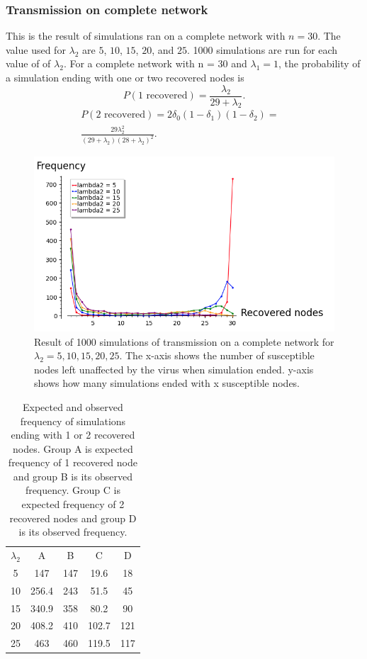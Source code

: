 \documentclass[12pt]{article} %
\numberwithin{equation}{section}
\begin{document}
\subsubsection{Transmission on complete network}\label{simsircomsec}
This is the result of simulations ran on a complete network with $n=30$. The value used for $\lambda_2$ are $5$, $10$, $15$, $20$, and $25$. 1000 simulations are run for each value of of $\lambda_2$. For a complete network with n = 30 and $\lambda_1 = 1$, the probability of a simulation ending with one or two recovered nodes is
\begin{equation}\label{bara1complete}
    P(\text{1 recovered}) = \frac{\lambda_2}{29+\lambda_2}.
\end{equation}
\begin{align}\label{bara2complete}
    P(\text{2 recovered}) = 2\delta_0(1-\delta_1)(1-\delta_2) = & \\ \frac{29\lambda_2^2}{(29+\lambda_2)(28+\lambda_2)^2}.
\end{align}
\begin{figure}[H]
    \centering
    \includegraphics[scale=0.7]{completeSIR.png}   
    \caption{Result of 1000 simulations of transmission on a complete network for $\lambda_2 = 5,10,15,20,25$. The x-axis shows the number of susceptible nodes left unaffected by the virus when simulation ended. y-axis shows how many simulations ended with x susceptible nodes.}
    \label{completesirplot}
\end{figure}
\begin{table}[H]
    \centering
   \begin{tabular}{c|c|c|c|c}
     $\lambda_2$&  A& B& C&D\\
     5& 147& 147 &19.6&18 \\
     10& 256.4& 243 &51.5&45 \\
     15& 340.9& 358&80.2&90  \\
     20& 408.2& 410 &102.7&121\\
     25& 463& 460 &119.5&117\\
\end{tabular} 
    \label{tablecompletesir}
    \caption{Expected and observed frequency of simulations ending with 1 or 2 recovered nodes. Group A is expected frequency of 1 recovered node and group B is its observed frequency. Group C is expected frequency of 2 recovered nodes and group D is its observed frequency.}
\end{table}
\end{document}
